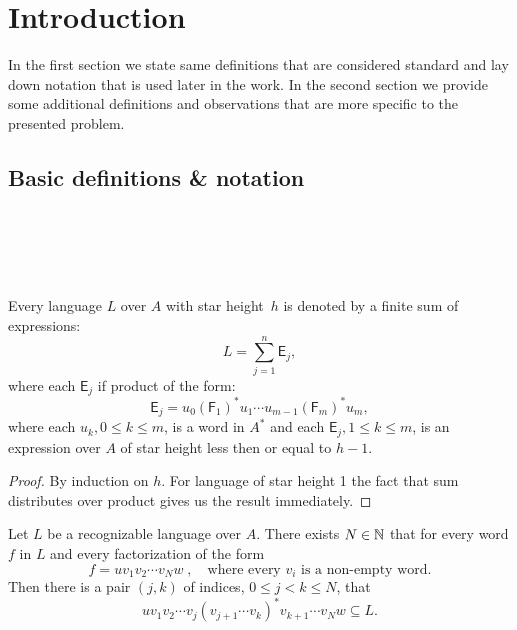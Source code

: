\chapter{Introduction}

In the first section we state same definitions that are considered standard and lay down notation that is used later in the work. In the second section we provide some additional definitions and observations that are more specific to the presented problem.

\section{Basic definitions \& notation}

\begin{defn} \\
    \\
\end{defn}

\begin{defn} \\
\end{defn}

\begin{defn}
\end{defn}

\begin{lemma}\label{lm:distributivity}
    Every language $L$ over $A$ with star height~$h$ is denoted by a finite sum of expressions:
    \[
        L = \sum_{j=1}^n \mathsf{E}_j,
    \]
    where each $\mathsf{E}_j$ if product of the form:
    \[
        \mathsf{E}_j = u_0{(\mathsf{F}_1)}^*u_1 \dotsm u_{m-1}{(\mathsf{F}_m)}^*u_m,
    \]
    where each $u_k, 0 \leq k \leq m$, is a word in $A^*$ and each $\mathsf{E}_j, 1 \leq k \leq m$, is an expression over $A$ of star height less then or equal to $h-1$.
\end{lemma}

\begin{proof}
    By induction on $h$. For language of star height 1 the fact that sum distributes over product gives us the result immediately. 
\end{proof}

\begin{lemma}\label{lm:block_star_lemma}
    Let $L$ be a recognizable language over $A$. There exists $N \in \mathbb{N}$ that for every word $f$ in $L$ and every factorization of the form
    \[
        f = u v_1 v_2 \dotsm v_N w \; , \quad \text{where every $v_i$ is a non-empty word.}
    \]
    Then there is a pair $(j,k)$ of indices, $0 \leq j < k \leq N$, that
    \[
        u v_1 v_2 \dotsm v_j {(v_{j+1} \dotsm v_k)}^* v_{k+1} \dotsm v_N w \subseteq L.
    \]
\end{lemma}


